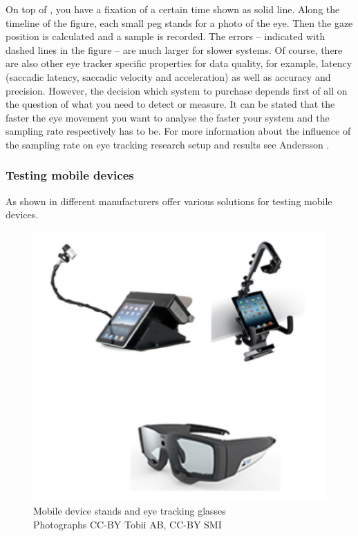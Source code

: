 \documentclass[output=paper]{langsci/langscibook}
\begin{document}
On top of , you have a fixation of a certain time shown as solid line. Along the timeline of the figure, each small peg stands for a photo of the eye. Then the gaze position is calculated and a sample is recorded. The errors -- indicated with dashed lines in the figure -- are much larger for slower systems. Of course, there are also other eye tracker specific properties for data quality, for example, latency (saccadic latency, saccadic velocity and acceleration) as well as accuracy and precision. However, the decision which system to purchase depends first of all on the question of what you need to detect or measure. It can be stated that the faster the eye movement you want to analyse the faster your system and the sampling rate respectively has to be. For more information about the influence of the sampling rate on eye tracking research setup and results see Andersson \citep[cf.][]{Andersson2009}. 

\subsubsection{Testing mobile devices}

As shown in  different manufacturers offer various solutions for testing mobile devices. 

\begin{figure}
 \includegraphics[width=.6\textwidth]{figures/Roesener5.png}
 \caption{Mobile device stands and eye tracking glasses \citep{Tobii2014, SMI2014} \\{\scriptsize Photographs CC-BY Tobii AB, CC-BY SMI}}
 \label{roesener:fig:5}
\end{figure} 
\end{document}
